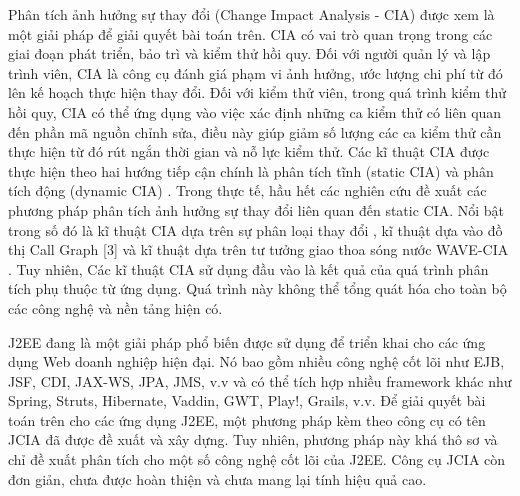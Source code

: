 \documentclass[12pt]{report}
\begin{document}
Phân tích ảnh hưởng sự thay đổi (Change Impact Analysis - CIA) được xem là một
giải pháp để giải quyết bài toán trên. CIA có vai trò quan trọng trong các giai đoạn phát
triển, bảo trì và kiểm thử hồi quy. Đối với người quản lý và lập trình viên, CIA là công cụ
đánh giá phạm vi ảnh hưởng, ước lượng chi phí từ đó lên kế hoạch thực hiện thay đổi.
Đối với kiểm thử viên, trong quá trình kiểm thử hồi quy, CIA có thể ứng dụng vào việc
xác định những ca kiểm thử có liên quan đến phần mã nguồn chỉnh sửa, điều này giúp
giảm số lượng các ca kiểm thử cần thực hiện từ đó rút ngắn thời gian và nỗ lực kiểm thử.
Các kĩ thuật CIA được thực hiện theo hai hướng tiếp cận chính là phân tích tĩnh (static
CIA) và phân tích động (dynamic CIA) \cite{cia-survey}. Trong thực tế, hầu hết các nghiên cứu đề xuất
các phương pháp phân tích ảnh hưởng sự thay đổi liên quan đến static CIA. Nổi bật trong
số đó là kĩ thuật CIA dựa trên sự phân loại thay đổi \cite{cia-ct}, kĩ thuật dựa vào đồ thị Call
Graph [3] và kĩ thuật dựa trên tư tưởng giao thoa sóng nước WAVE-CIA \cite{cia-wave}. Tuy nhiên,
Các kĩ thuật CIA sử dụng đầu vào là kết quả của quá trình phân tích phụ thuộc từ ứng
dụng. Quá trình này không thể tổng quát hóa cho toàn bộ các công nghệ và nền tảng hiện
có.

J2EE đang là một giải pháp phổ biến được sử dụng để triển khai cho các ứng dụng Web doanh nghiệp hiện đại. Nó bao gồm nhiều công nghệ cốt lõi như EJB, JSF, CDI, JAX-WS, JPA, JMS, v.v và có thể tích hợp nhiều framework khác như Spring, Struts, Hibernate, Vaddin, GWT, Play!, Grails, v.v. Để giải quyết bài toán trên cho các ứng dụng J2EE, một phương pháp kèm theo công cụ có tên JCIA \cite{cia-uet} đã được đề xuất và xây dựng. Tuy nhiên, phương pháp này khá thô sơ và chỉ đề xuất phân tích cho một số công nghệ cốt lõi của J2EE. Công cụ JCIA còn đơn giản, chưa được hoàn thiện và chưa mang lại tính
hiệu quả cao.
\end{document}

